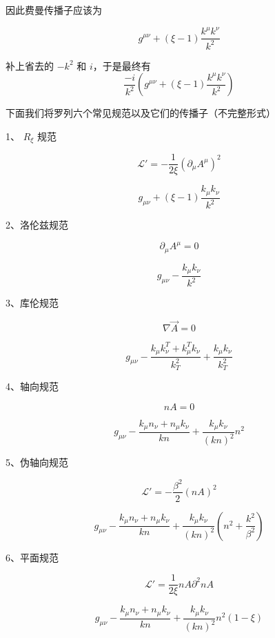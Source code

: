 因此费曼传播子应该为

\begin{equation}
g^{\mu\nu}+(\xi-1)\frac{k^\mu k^\nu}{k^2}
\end{equation}

补上省去的 $-k^2$ 和 $i$，于是最终有
\begin{equation}
\frac{-i}{k^2}\left(g^{\mu\nu}+(\xi-1)\frac{k^\mu k^\nu}{k^2}\right)
\end{equation}


下面我们将罗列六个常见规范以及它们的传播子（不完整形式）

1、 $R_\xi$ 规范

\begin{equation}
\mathcal{L}'=-\frac{1}{2\xi}(\partial_\mu A^\mu)^2
\end{equation}


\begin{equation}
g_{\mu\nu}+(\xi-1)\frac{k_\mu k_\nu}{k^2}
\end{equation}

2、洛伦兹规范

\begin{equation}
\partial_\mu A^\mu=0
\end{equation}


\begin{equation}
g_{\mu\nu}-\frac{k_\mu k_\nu}{k^2}
\end{equation}

3、库伦规范

\begin{equation}
\nabla \vec A=0
\end{equation}


\begin{equation}
g_{\mu\nu}-\frac{k_\mu k^T_\nu+k^T_\mu k_\nu}{k^2_T}+\frac{k_\mu k_\nu}{k^2_T}
\end{equation}

4、轴向规范

\begin{equation}
nA=0
\end{equation}

\begin{equation}
g_{\mu\nu}-\frac{k_\mu n_\nu+n_\mu k_\nu}{kn}+\frac{k_\mu k_\nu}{(kn)^2}n^2
\end{equation}

5、伪轴向规范

\begin{equation}
\mathcal{L}'=-\frac{\beta^2}{2}(nA)^2
\end{equation}

\begin{equation}
g_{\mu\nu}-\frac{k_\mu n_\nu+n_\mu k_\nu}{kn}+\frac{k_\mu k_\nu}{(kn)^2}\left(n^2+\frac{k^2}{\beta^2}\right)
\end{equation}

6、平面规范

\begin{equation}
\mathcal{L}'=\frac{1}{2\xi}nA\partial^2nA
\end{equation}

\begin{equation}
g_{\mu\nu}-\frac{k_\mu n_\nu+n_\mu k_\nu}{kn}+\frac{k_\mu k_\nu}{(kn)^2}n^2(1-\xi) 
\end{equation}
